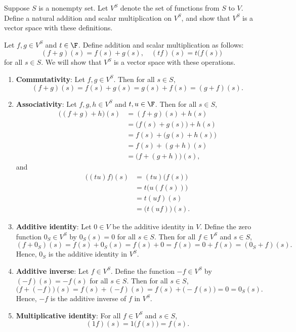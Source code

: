 \begin{exercise}
Suppose $S$ is a nonempty set. Let $V^S$ denote the set of functions from $S$
to $V$. Define a natural addition and scalar multiplication on $V^S$, and show
that $V^S$ is a vector space with these definitions.
\end{exercise}
\begin{solution}
Let $f,g\in V^S$ and $t\in\F$. Define addition and scalar multiplication as
follows:
\[ (f+g)(s) = f(s)+g(s), \quad (tf)(s) = t\bigl(f(s)\bigr) \]
for all $s\in S$. We will show that $V^S$ is a vector space with these
operations.
\begin{enumerate}[label=\arabic*)]
\item \textbf{Commutativity}: Let $f,g\in V^S$. Then for all $s\in S$,
  \[ (f+g)(s) = f(s)+g(s) = g(s)+f(s) = (g+f)(s). \]
\item \textbf{Associativity}: Let $f,g,h\in V^S$ and $t,u\in\F$. Then for all
  $s\in S$,
  \begin{align*}
  \bigl((f+g)+h\bigr)(s) &= (f+g)(s)+h(s)\\
    &= \bigl(f(s)+g(s)\bigr)+h(s)\\
    &= f(s)+\bigl(g(s)+h(s)\bigr)\\
    &= f(s)+(g+h)(s)\\
    &= \bigl(f+(g+h)\bigr)(s),
  \end{align*}
  and
  \begin{align*}
  \bigl((tu)f\bigr)(s) &= (tu)\bigl(f(s)\bigr)\\
    &= t\bigl(u(f(s))\bigr)\\
    &= t(uf)(s)\\
    &= \bigl(t(uf)\bigr)(s).
  \end{align*}
\item \textbf{Additive identity}: Let $0\in V$ be the additive identity in $V$.
  Define the zero function $0_S\in V^S$ by $0_S(s)=0$ for all $s\in S$. Then
  for all $f\in V^S$ and $s\in S$,
  \[ (f+0_S)(s) = f(s)+0_S(s) = f(s)+0 = f(s) = 0+f(s) = (0_S+f)(s). \]
  Hence, $0_S$ is the additive identity in $V^S$.
\item \textbf{Additive inverse}: Let $f\in V^S$. Define the function
  $-f\in V^S$ by $(-f)(s)=-f(s)$ for all $s\in S$. Then for all $s\in S$,
  \[ \bigl(f+(-f)\bigr)(s) = f(s)+(-f)(s) = f(s)+\bigl(-f(s)\bigr) = 0
     = 0_S(s). \]
  Hence, $-f$ is the additive inverse of $f$ in $V^S$.
\item \textbf{Multiplicative identity}: For all $f\in V^S$ and $s\in S$,
  \[ (1f)(s) = 1\bigl(f(s)\bigr) = f(s). \]

\end{enumerate}
\end{solution}
